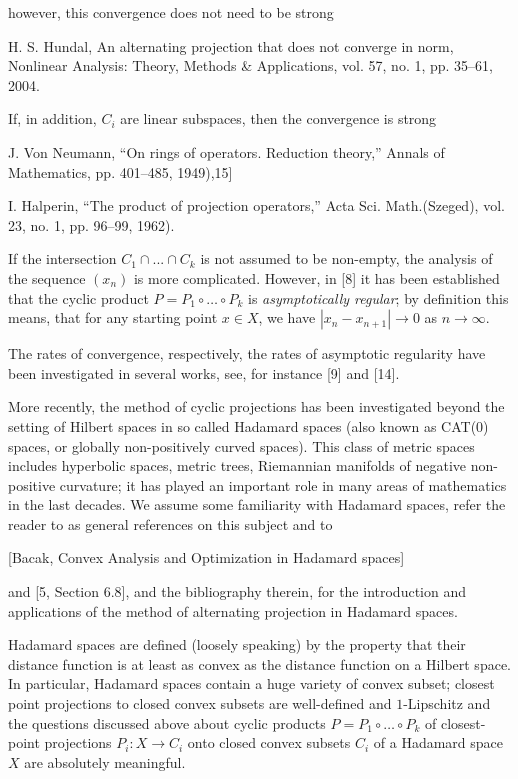 \documentclass[a4paper,10pt]{article}
\begin{document}
 however, this convergence does not need to be strong
 
 H. S. Hundal, An alternating projection that does not converge in
 norm, Nonlinear Analysis: Theory, Methods \& Applications, vol. 57,
 no. 1, pp. 35–61, 2004.
 
 
   If, in addition,  $C_i$ are  linear subspaces, then the convergence is strong

 J. Von Neumann, “On rings of operators. Reduction theory,” Annals of
Mathematics, pp. 401–485, 1949),15] 

I. Halperin, “The product of projection operators,” Acta Sci.
Math.(Szeged), vol. 23, no. 1, pp. 96–99, 1962).


 If the intersection  $C_1\cap ...\cap C_k$ is not assumed to be non-empty,  the analysis of the sequence $(x_n)$ is more complicated. However, in [8] it has been established 
 that the cyclic product  $P= P_1\circ \dots \circ P_k$ is \emph{asymptotically regular};
by definition this means, that for any starting point  $x\in X$, we have  $|x_n-x_{n+1}|\to 0$ as $n\to \infty$.

The rates of convergence, respectively, the rates of asymptotic regularity have been investigated in several works, see, for instance [9] and [14].



 More recently, the method of cyclic  projections has been investigated beyond the setting of Hilbert spaces in so called Hadamard spaces (also known as CAT(0) spaces, or globally non-positively curved spaces). This class of metric spaces includes hyperbolic spaces, metric trees, Riemannian manifolds of negative non-positive curvature; it has played an important role in many areas of mathematics  in the last decades.  We assume some familiarity with Hadamard spaces, refer the reader to \cite{BBI,BH,AKP,AKP_inv} as general references on this subject and to 
 
 [Bacak, Convex Analysis and Optimization in Hadamard spaces] 
 
 and
 [5, Section 6.8], and the bibliography therein,  for the introduction and applications of the method of alternating projection in Hadamard spaces.

Hadamard spaces are defined (loosely speaking) by the property that their distance function is at least as convex as the distance function on a Hilbert space. In particular,
Hadamard spaces contain a huge variety of convex subset; closest point projections to closed convex subsets are well-defined and $1$-Lipschitz and the questions discussed above about cyclic products $P= P_1\circ \dots \circ P_k$ of closest-point projections $P_i:X\to C_i$ onto closed convex subsets $C_i$ of a Hadamard space $X$ are absolutely meaningful.
\end{document}
